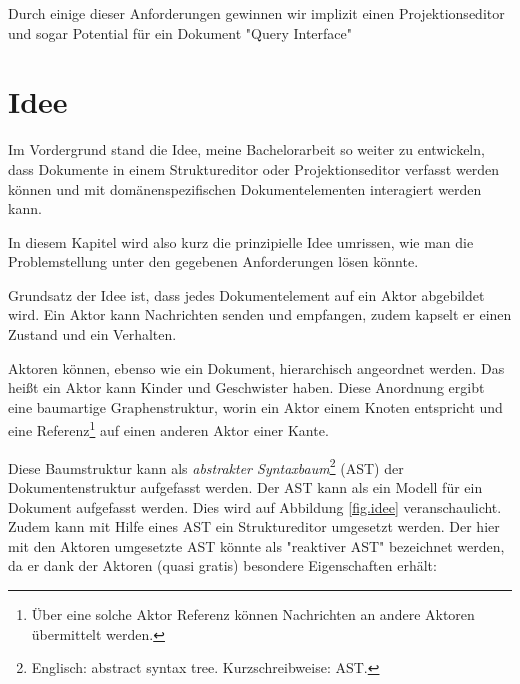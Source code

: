 Durch einige dieser Anforderungen gewinnen wir implizit einen Projektionseditor und
sogar Potential für ein Dokument "Query Interface"

\section{Idee}


Im Vordergrund stand die Idee, meine Bachelorarbeit so weiter zu entwickeln, dass Dokumente
in einem Struktureditor oder Projektionseditor verfasst werden können und mit domänenspezifischen Dokumentelementen
interagiert werden kann.

In diesem Kapitel wird also kurz die prinzipielle Idee umrissen,
wie man die Problemstellung unter den gegebenen Anforderungen lösen könnte.

Grundsatz der Idee ist, dass jedes Dokumentelement auf ein Aktor abgebildet wird.
Ein Aktor kann Nachrichten senden und empfangen, zudem kapselt er einen Zustand und ein Verhalten.

Aktoren können, ebenso wie ein Dokument, hierarchisch angeordnet werden.
Das heißt ein Aktor kann Kinder und Geschwister haben.
Diese Anordnung ergibt eine baumartige Graphenstruktur, worin ein Aktor
einem Knoten entspricht und eine Referenz\footnote{Über eine solche Aktor Referenz können Nachrichten an andere Aktoren übermittelt werden.} auf einen anderen Aktor einer Kante.

Diese Baumstruktur kann als \emph{abstrakter Syntaxbaum}\footnote{
Englisch: abstract syntax tree. Kurzschreibweise: AST.} (AST) der Dokumentenstruktur aufgefasst werden.
Der AST kann als ein Modell für ein Dokument aufgefasst werden.
Dies wird auf Abbildung \ref{fig.idee} veranschaulicht.
Zudem kann mit Hilfe eines AST ein Struktureditor umgesetzt werden.
Der hier mit den Aktoren umgesetzte AST könnte als "reaktiver AST" bezeichnet werden,
da er dank der Aktoren (quasi gratis) besondere Eigenschaften erhält:

